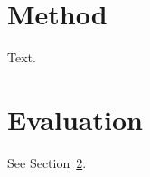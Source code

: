 \documentclass{article}
\begin{document}
\section{Method}\label{sec:method}
Text.
\section{Evaluation}\label{sec:method}
See Section~\ref{sec:method}.
\end{document}
